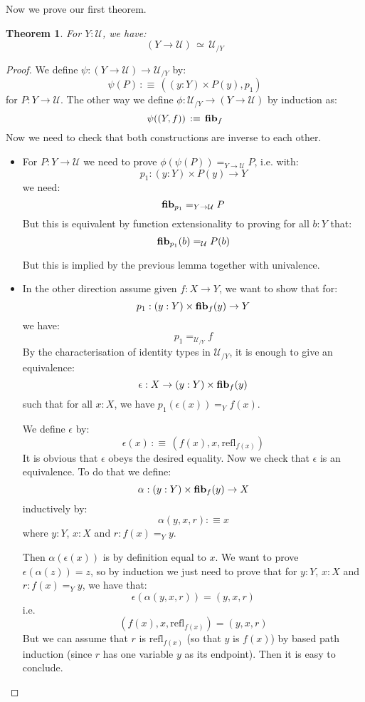 \documentclass{article}
\newcommand{\U}{{\mathcal U}}
\renewcommand{\r}{\rightarrow}
\newcommand{\refl}{\mathrm{refl}}
\newcommand{\fib}{\mathrm{\bf fib}}
\newtheorem{theorem}{Theorem}
\begin{document}
Now we prove our first theorem.

\begin{theorem}
For $Y:\U$, we have:
\[(Y\r \U) \, \simeq\, \U_{/Y}\]
\end{theorem}


\begin{proof}
We define $\psi : (Y\r \U)\r \U_{/Y}$ by:
\[\psi(P) \, :\equiv \, ((y:Y)\times P(y) , p_1)\]
for $P:Y\r \U$. The other way we define $\phi : \U_{/Y}\r (Y\r \U)$ by induction as:
\[\psi((Y,f)) \, :\equiv \, \fib_f\]
Now we need to check that both constructions are inverse to each other.
\begin{itemize}
\item  For $P:Y\r \U$ we need to prove $\phi(\psi(P)) =_{Y\r \U} P$, i.e. with: 
\[p_1 : (y:Y)\times P(y)\r Y\]
we need:
\[\fib_{p_1} =_{Y\r \U} P\]
But this is equivalent by function extensionality to proving for all $b:Y$ that:
\[\fib_{p_1}(b) =_\U P(b) \]

But this is implied by the previous lemma together with univalence.

\item In the other direction assume given $f:X\r Y$, we want to show that for: 
\[p_1 : (y:Y)\times \fib_f(y) \r Y\]
we have:
\[p_1=_{\U_{/Y}} f\]
By the characterisation of identity types in $\U_{/Y}$, it is enough to give an equivalence:
\[\epsilon : X\r (y:Y)\times \fib_f(y)  \]
such that for all $x:X$, we have $p_1(\epsilon(x)) =_Y f(x)$.

We define $\epsilon$ by:
\[\epsilon(x) \, :\equiv\, (f(x),x,\refl_{f(x)})\]
It is obvious that $\epsilon$ obeys the desired equality. Now we check that $\epsilon$ is an equivalence. To do that we define: 
\[\alpha : (y:Y)\times \fib_f(y) \r X\] 
inductively by: 
\[\alpha(y,x,r) :\equiv x\]
where $y:Y$, $x:X$ and $r:f(x)=_Y y$.

Then $\alpha(\epsilon(x))$ is by definition equal to $x$. We want to prove $\epsilon(\alpha(z)) = z$, so by induction we just need to prove that for $y:Y$, $x:X$ and $r:f(x)=_Y y$, we have that:
\[\epsilon(\alpha(y,x,r)) = (y,x,r)\]
i.e. 
\[(f(x),x,\refl_{f(x)}) = (y,x,r)\]
But we can assume that $r$ is $\refl_{f(x)}$ (so that $y$ is $f(x)$) by based path induction (since $r$ has one variable $y$ as its endpoint). Then it is easy to conclude.%

\end{itemize}
\end{proof}
\end{document}
